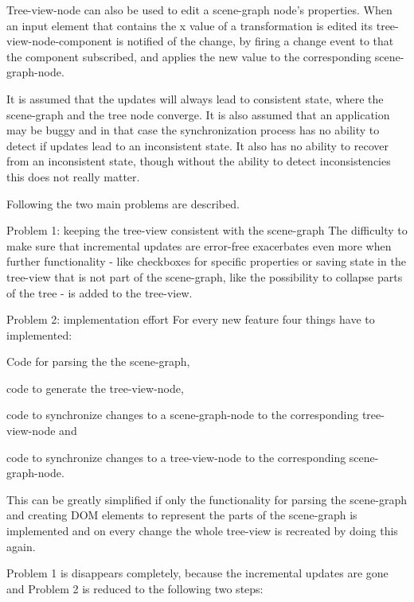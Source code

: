 Tree-view-node can also be used to edit a scene-graph node's properties. When an
input element that contains the x value of a transformation is edited its
tree-view-node-component is notified of the change, by firing a change event to
that the component subscribed, and applies the new value to the corresponding
scene-graph-node.

It is assumed that the updates will always lead to consistent state, where the
scene-graph and the tree node converge. It is also assumed that an application
may be buggy and in that case the synchronization process has no ability to
detect if updates lead to an inconsistent state. It also has no ability to
recover from an inconsistent state, though without the ability to detect
inconsistencies this does not really matter.

Following the two main problems are described.

\clearpage

\begin{description*}
  \item[Problem 1: keeping the tree-view consistent with the scene-graph]
    The difficulty to make sure that incremental updates are error-free
    exacerbates even more when further functionality - like checkboxes for
    specific properties or saving state in the tree-view that is not part of
    the scene-graph, like the possibility to collapse parts of the tree - is
    added to the tree-view.
  \item[Problem 2: implementation effort]
    For every new feature four things have to implemented:
    \begin{enumerate*}
      \item Code for parsing the the scene-graph,
      \item code to generate the tree-view-node,
      \item code to synchronize changes to a scene-graph-node to the corresponding tree-view-node and
      \item code to synchronize changes to a tree-view-node to the corresponding scene-graph-node.
    \end{enumerate*}
\end{description*}

This can be greatly simplified if only the functionality for parsing the
scene-graph and creating DOM elements to represent the parts of the scene-graph
is implemented and on every change the whole tree-view is recreated by doing
this again.

Problem 1 is disappears completely, because the incremental updates are gone and
Problem 2 is reduced to the following two steps:

